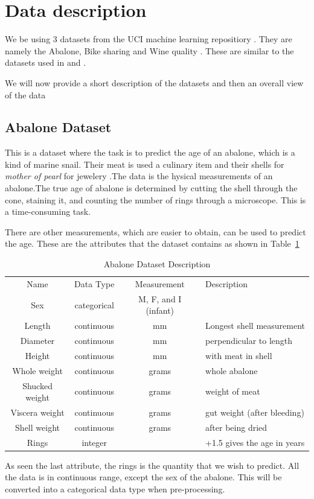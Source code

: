 \documentclass{article}
\begin{document}
\clearpage
\section{Data description}
We be using 3 datasets from the UCI machine learning repositiory \cite{Dua:2019}. They are namely the Abalone, Bike sharing \cite{Bikes} and Wine quality \cite{Winequality}. These are similar to the datasets used in \cite{Chernodub2014} and \cite{Main_EKS_Paper}. 

We will now provide a short description of the datasets and then an overall view of the data

\subsection{Abalone Dataset}
This is a dataset where the task is to predict the age of an abalone, which is a kind of marine snail. Their meat is used a culinary item and their shells for \textit{mother of pearl} for jewelery .The data is the hysical measurements of an abalone.The true age of abalone is determined by cutting the shell through the cone, staining it, and counting the number of rings through a microscope. This is a time-consuming task. 

There are other measurements, which are easier to obtain, can be used to predict the age. These are the attributes that the dataset contains as shown in Table~\ref{tab:Abalone}

\begin{table}[ht]
    \centering
    \begin{tabular}{c|c|c|l}
    \hline
    Name	&	Data Type &	Measurement	& Description\\
    \hhline{=|=|=|=}
	Sex		&categorical	&		M, F, and I (infant)\\
	Length		&continuous	&mm	&Longest shell measurement\\
	Diameter	&continuous	&mm	&perpendicular to length\\
	Height		&continuous	&mm	&with meat in shell\\
	Whole weight	&continuous	&grams	&whole abalone\\
	Shucked weight	&continuous	&grams	&weight of meat\\
	Viscera weight	&continuous	&grams	&gut weight (after bleeding)\\
	Shell weight	&continuous	&grams	&after being dried\\
	Rings		&integer			&&+1.5 gives the age in years\\
	\hline
    \end{tabular}
    \caption{Abalone Dataset Description}
    \label{tab:Abalone}
\end{table}
As seen the last attribute, the rings is the quantity that we wish to predict. All the data is in continuous range, except the sex of the abalone. This will be converted into a categorical data type when pre-processing.
\end{document}
